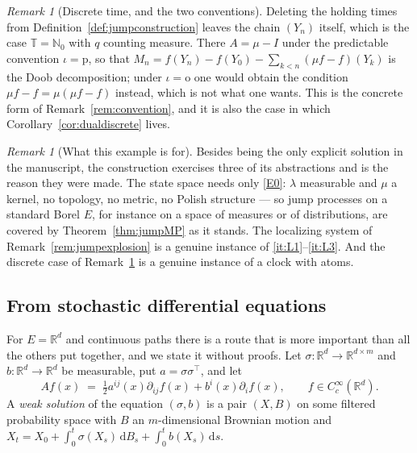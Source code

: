 \documentclass[11pt,a4paper]{article}
\theoremstyle{plain}
\theoremstyle{definition}
\theoremstyle{remark}
\newtheorem{remark}[theorem]{Remark}
\newcommand{\R}{\mathbb{R}}
\newcommand{\N}{\mathbb{N}}
\newcommand{\T}{\mathbb{T}}                     %
\newcommand{\dif}{\,\mathrm{d}}
\begin{document}
\begin{remark}[Discrete time, and the two conventions]
  \label{rem:jumpdiscrete}
  Deleting the holding times from Definition~\ref{def:jumpconstruction} leaves the
  chain $(Y_n)$ itself, which is the case $\T = \N_0$ with $q$ counting measure.
  There $A = \mu - I$ under the predictable convention $\iota = \mathrm{p}$, so
  that $M_n = f(Y_n) - f(Y_0) - \sum_{k<n}(\mu f - f)(Y_k)$ is the Doob
  decomposition; under $\iota = \mathrm{o}$ one would obtain the condition
  $\mu f - f = \mu(\mu f - f)$ instead, which is not what one wants.  This is the
  concrete form of Remark~\ref{rem:convention}, and it is also the case in which
  Corollary~\ref{cor:dualdiscrete} lives.
\end{remark}

\begin{remark}[What this example is for]
  \label{rem:jumppoint}
  Besides being the only explicit solution in the manuscript, the construction
  exercises three of its abstractions and is the reason they were made.  The state
  space needs only \eqref{E0}: $\lambda$ measurable and $\mu$ a kernel, no topology, no
  metric, no Polish structure --- so jump processes on a standard Borel $E$, for
  instance on a space of measures or of distributions, are covered by
  Theorem~\ref{thm:jumpMP} as it stands.  The localizing system of
  Remark~\ref{rem:jumpexplosion} is a genuine instance of \ref{it:L1}--\ref{it:L3}.
  And the discrete case of Remark~\ref{rem:jumpdiscrete} is a genuine instance of a
  clock with atoms.
\end{remark}

\subsection{From stochastic differential equations}
\label{ssec:exsde}

For $E = \R^d$ and continuous paths there is a route that is more important than
all the others put together, and we state it without proofs.  Let
$\sigma : \R^d \to \R^{d \times m}$ and $b : \R^d \to \R^d$ be measurable, put
$a = \sigma\sigma^{\top}$, and let
\begin{equation}
  \label{eq:sdegen}
  A f(x) \;=\; \tfrac{1}{2} a^{ij}(x) \partial_{ij} f(x) + b^i(x) \partial_i f(x) ,
  \qquad f \in C^\infty_c(\R^d) .
\end{equation}
A \emph{weak solution} of the equation $(\sigma,b)$ is a pair $(X,B)$ on some
filtered probability space with $B$ an $m$-dimensional Brownian motion and
$X_t = X_0 + \int_0^t \sigma(X_s)\dif B_s + \int_0^t b(X_s)\dif s$.
\end{document}
